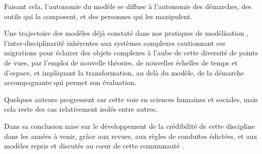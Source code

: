 Faisant cela, l'autonomie du modèle se diffuse à l'autonomie des démarches, des outils qui la composent, et des personnes qui les manipulent. 

Une trajectoire des modèles déjà constaté dans nos pratiques de modélisation \autocite{Banos2013}, l'inter-disciplinarité inhérentes aux systèmes complexes cautionnant ces migrations pour éclairer des objets complexes à l'aube de cette diversité de points de vues, par l'emploi de nouvelle théories, de nouvelles échelles de temps et d'espace, et impliquant la transformation, au delà du modèle, de la démarche accompagnante qui permet son évaluation. 

Quelques auteurs progressent sur cette voie en sciences humaines et sociales, mais cela reste des cas relativement isolés \autocite{Ngo2012} \autocite{Schmitt2014} \autocite{Heppenstall2007} \autocite{Stonedahl2011a} entre autres.

Dans sa conclusion \autocite{Rouchier2013} mise sur le développement de la crédibilité de cette discipline dans les années à venir, grâce aux revues, aux règles de conduites édictées, et aux modèles repris et discutés au cœur de cette communauté \autocite{Hales2003}. 






